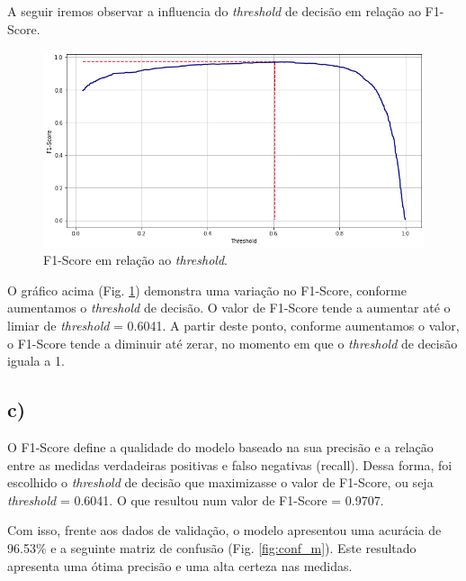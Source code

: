 \documentclass[12pt]{article}
\begin{document}
\pagebreak

A seguir iremos observar a influencia do \textit{threshold} de decisão em relação ao F1-Score.

\begin{figure}[h!]
	\centering
	\includegraphics[width=\linewidth]{images/f1_thr.png}
	\caption{F1-Score em relação ao \textit{threshold}.}
	\label{fig:f1_thr}
\end{figure}

O gráfico acima (Fig. \ref{fig:f1_thr}) demonstra uma variação no F1-Score, conforme aumentamos o \textit{threshold} de decisão. O valor de F1-Score tende a aumentar até o limiar de \textit{threshold} = 0.6041. A partir deste ponto, conforme aumentamos o valor, o F1-Score tende a diminuir até zerar, no momento em que o \textit{threshold} de decisão iguala a 1.

\subsection*{c)}

O F1-Score define a qualidade do modelo baseado na sua precisão e a relação entre as medidas verdadeiras positivas e falso negativas (recall). Dessa forma, foi escolhido o \textit{threshold} de decisão que maximizasse o valor de F1-Score, ou seja \textit{threshold} = 0.6041. O que resultou num valor de F1-Score = 0.9707.

Com isso, frente aos dados de validação, o modelo apresentou uma acurácia de 96.53\% e a seguinte matriz de confusão (Fig. \ref{fig:conf_m}). Este resultado apresenta uma ótima precisão e uma alta certeza nas medidas.
\end{document}
